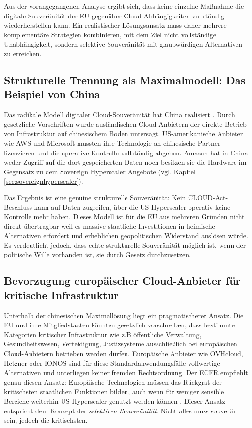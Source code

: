 Aus der vorangegangenen Analyse ergibt sich, dass keine 
einzelne Maßnahme die digitale Souveränität der \ac{EU} 
gegenüber Cloud-Abhängigkeiten vollständig wiederherstellen 
kann. Ein realistischer Lösungsansatz muss daher mehrere 
komplementäre Strategien kombinieren, mit dem Ziel nicht 
vollständige Unabhängigkeit, sondern selektive Souveränität mit 
glaubwürdigen Alternativen zu erreichen. 

\subsection{Strukturelle Trennung als Maximalmodell: 
Das Beispiel von China}

Das radikale Modell digitaler Cloud-Souveränität hat 
China realisiert \cite{ragland2014redcloud}. Durch gesetzliche Vorschriften wurde 
ausländischen Cloud-Anbietern der direkte Betrieb von 
Infrastruktur auf chinesischem Boden untersagt. 
US-amerikanische Anbieter wie \ac{AWS} und Microsoft mussten 
ihre Technologie an chinesische Partner lizenzieren und 
die operative Kontrolle vollständig abgeben. Amazon 
hat in China weder Zugriff auf die dort gespeicherten Daten
noch besitzen sie die Hardware im Gegensatz zu dem Sovereign Hyperscaler Angebote (vgl. Kapitel \ref{sec:sovereignhyperscaler}). 

Das Ergebnis ist eine genuine strukturelle Souveränität: 
Kein CLOUD-Act-Beschluss kann auf Daten zugreifen, über 
die US-Hyperscaler operativ keine Kontrolle mehr haben. Dieses 
Modell ist für die \ac{EU} aus mehreren Gründen nicht 
direkt übertragbar weil es massive staatliche 
Investitionen in heimische Alternativen erfordert und erheblichen geopolitischen 
Widerstand auslösen würde. Es verdeutlicht jedoch, dass 
echte strukturelle Souveränität möglich ist, wenn 
der politische Wille vorhanden ist, sie durch 
Gesetz durchzusetzen.

\subsection{Bevorzugung europäischer Cloud-Anbieter 
für kritische Infrastruktur}

Unterhalb der chinesischen Maximallösung liegt ein 
pragmatischerer Ansatz. Die \ac{EU} und ihre Mitgliedstaaten 
könnten gesetzlich vorschreiben, dass bestimmte 
Kategorien kritischer Infrastruktur wie z.B öffentliche 
Verwaltung, Gesundheitswesen, Verteidigung, 
Justizsysteme ausschließlich bei europäischen 
Cloud-Anbietern betrieben werden dürfen. Europäische 
Anbieter wie OVHcloud, Hetzner oder IONOS sind für 
diese Standardanwendungsfälle vollwertige Alternativen 
und unterliegen keiner fremden Rechtsordnung. Der 
\ac{ECFR} empfiehlt genau diesen Ansatz: Europäische 
Technologien müssen das Rückgrat der kritischsten 
staatlichen Funktionen bilden, auch wenn für 
weniger sensible Bereiche weiterhin US-Hyperscaler 
genutzt werden können \cite{ecfr2025eurostack}. 
Dieser Ansatz entspricht dem Konzept der \textit{selektiven 
Souveränität}: Nicht alles muss souverän sein,
jedoch die kritischsten.

